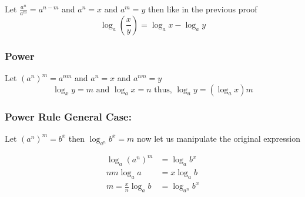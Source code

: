 Let \(\frac{a^n}{a^m} = a^{n - m}\) and \(a^n = x\) and \(a^m = y\) then like in the previous proof
\[
\log_a \left(\frac{x}{y}\right) = \log_a x - \log_a y
\]
\QED 

\subsubsection{Power}

Let \({(a^n)}^m = a^{nm}\) and \(a^n = x\) and \(a^{nm} = y\)
\[
\log_x y = m \text{ and } \log_a x = n \text{ thus, } \log_a y = (\log_a x )m
\]
\QED

\subsubsection{Power Rule General Case:}

Let \({(a^n)}^m = b^x\) then \(\log_{a^n} b^x = m\) now let us manipulate the original expression

\begin{align*}
\log_a {(a^n)}^m &= \log_a b^x\\
nm \log_a a &= x \log_a b\\
m = \frac{x}{n} \log_a b &=  \log_{a^n} b^x 
\end{align*}

\QED
